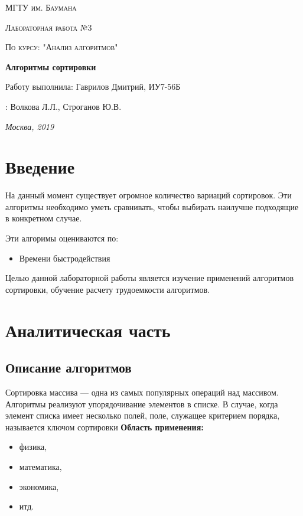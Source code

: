 \documentclass[12pt]{report}
\begin{document}
\begin{titlepage}
	\centering
	{\scshape\LARGE МГТУ им. Баумана \par}
	\vspace{3cm}
	{\scshape\Large Лабораторная работа №3\par}
	\vspace{0.5cm}	
	{\scshape\Large По курсу: "Анализ алгоритмов"\par}
	\vspace{1.5cm}
	{\huge\bfseries Алгоритмы сортировки\par}
	\vspace{2cm}
	\Large Работу выполнила: Гаврилов Дмитрий, ИУ7-56Б\par
	\vspace{0.5cm}
	:  Волкова Л.Л., Строганов Ю.В.\par

	\vfill
	\large \textit {Москва, 2019} \par
\end{titlepage}

\tableofcontents

\newpage
\chapter*{Введение}

На данный момент существует огромное количество вариаций сортировок.
Эти алгоритмы необходимо уметь сравнивать, чтобы выбирать наилучше подходящие в конкретном случае. 

Эти алгоримы оцениваются по:

\begin{itemize}
	\item Времени быстродействия
\end{itemize}

Целью данной лабораторной работы является изучение применений алгоритмов сортировки, обучение расчету трудоемкости алгоритмов.


\chapter{Аналитическая часть}
\section{Описание алгоритмов}
Сортировка массива — одна из самых популярных операций над массивом. Алгоритмы реализуют упорядочивание элементов в списке.
 В случае, когда элемент списка имеет несколько полей, поле, служащее критерием порядка, называется ключом сортировки
\textbf{Область применения:} 
\begin{itemize}
  	\item физика,
	\item математика,
	\item экономика,
	\item итд.
\end{itemize}
\end{document}
